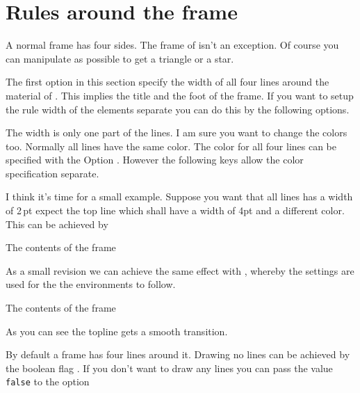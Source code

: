 \documentclass[openany,12pt,tocdepth=3]{ltx-md}
\begin{document}
\section{Rules around the frame}\label{sec:lines}
A normal frame has four sides. The frame of  isn't an exception. Of course
you can manipulate as possible to get a triangle or a star.

The first option in this section specify the width of all four lines around the material of .
This implies the title and the foot of the frame. If you want to setup the rule width of the elements
separate you can do this by the following options.


The width is only one part of the lines. I am sure you want to change the colors too. 
Normally all lines have the same color. The color for all four lines can be specified 
with the Option . However the following keys allow the color
specification separate.


I think it's time for a small example. Suppose you want that all lines has a width of
2\,pt expect the top line which shall have a width of 4pt and a different color.
This can be achieved by
\begin{ltxexample}[caption=Example outer part,label=outer,result=true,]
 \begin{xframed}[line-width=2pt,line-width-top=4pt,
          line-color-top=blue]
   The contents of the frame
 \end{xframed}
\end{ltxexample}
As a small revision we can achieve the same effect with , 
whereby the settings are used for the the environments  to follow.
\begin{ltxexample}[caption={Example outer part II},]
 \xframedsetup[line-width=2pt,line-width-top=4pt
           ,line-color-top=blue]
 \begin{xframed}
   The contents of the frame
 \end{xframed}
\end{ltxexample}

As you can see the topline gets a smooth transition. 

By default a frame has four lines around it. Drawing no
lines can be achieved by the boolean flag .
If you don't want to draw any lines you can pass the value \texttt{false}
to the option 
\end{document}
